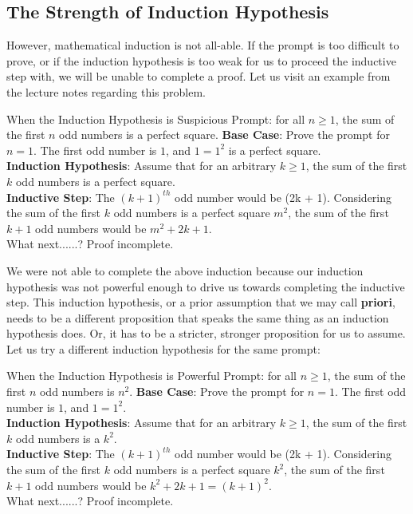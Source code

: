 \subsection{The Strength of Induction Hypothesis}
However, mathematical induction is not all-able. If the prompt is too difficult to prove, or if the induction hypothesis is too weak for us to proceed the inductive step with, we will be unable to complete a proof. Let us visit an example from the lecture notes regarding this problem.
\begin{ln-think}{When the Induction Hypothesis is Suspicious}{}
    Prompt: for all $n \geq 1$, the sum of the first $n$ odd numbers is a perfect square.
    \tcblower
    \textbf{Base Case}: Prove the prompt for $n = 1$. The first odd number is $1$, and $1 = 1 ^ 2$ is a perfect square. \\
    \textbf{Induction Hypothesis}: Assume that for an arbitrary $k \geq 1$, the sum of the first $k$ odd numbers is a perfect square. \\
    \textbf{Inductive Step}: The $(k + 1)^{th}$ odd number would be (2k + 1). Considering the sum of the first $k$ odd numbers is a perfect square $m^2$, the sum of the first $k + 1$ odd numbers would be $m^2 + 2k + 1$. \\
    What next......? Proof incomplete.
\end{ln-think}
We were not able to complete the above induction because our induction hypothesis was not powerful enough to drive us towards completing the inductive step. This induction hypothesis, or a prior assumption that we may call \textbf{priori}, needs to be a different proposition that speaks the same thing as an induction hypothesis does. Or, it has to be a stricter, stronger proposition for us to assume. Let us try a different induction hypothesis for the same prompt:
\begin{ln-think}{When the Induction Hypothesis is Powerful}{}
    Prompt: for all $n \geq 1$, the sum of the first $n$ odd numbers is $n^2$.
    \tcblower
    \textbf{Base Case}: Prove the prompt for $n = 1$. The first odd number is $1$, and $1 = 1 ^ 2$. \\
    \textbf{Induction Hypothesis}: Assume that for an arbitrary $k \geq 1$, the sum of the first $k$ odd numbers is a $k ^ 2$. \\
    \textbf{Inductive Step}: The $(k + 1)^{th}$ odd number would be (2k + 1). Considering the sum of the first $k$ odd numbers is a perfect square $k^2$, the sum of the first $k + 1$ odd numbers would be $k^2 + 2k + 1 = (k + 1) ^ 2$. \\
    What next......? Proof incomplete.
\end{ln-think}
